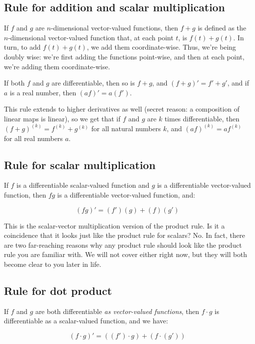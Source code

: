 \documentclass[10pt]{amsart}
\begin{document}
\subsection{Rule for addition and scalar multiplication}

If $f$ and $g$ are $n$-dimensional vector-valued functions, then $f +
g$ is defined as the $n$-dimensional vector-valued function that, at
each point $t$, is $f(t) + g(t)$. In turn, to add $f(t) + g(t)$, we
add them coordinate-wise. Thus, we're being doubly wise: we're first
adding the functions point-wise, and then at each point, we're adding
them coordinate-wise.

If both $f$ and $g$ are differentiable, then so is $f + g$, and $(f +
g)' = f' + g'$, and if $a$ is a real number, then $(af)' = a(f')$.

This rule extends to higher derivatives as well (secret reason: a
composition of linear maps is linear), so we get that if $f$ and $g$
are $k$ times differentiable, then $(f + g)^{(k)} = f^{(k)} + g^{(k)}$
for all natural numbers $k$, and $(af)^{(k)} = af^{(k)}$ for all real
numbers $a$.

\subsection{Rule for scalar multiplication}

If $f$ is a differentiable scalar-valued function and $g$ is a
differentiable vector-valued function, then $fg$ is a differentiable
vector-valued function, and:

$$(fg)' = (f')(g) + (f)(g')$$

This is the scalar-vector multiplication version of the product
rule. Is it a coincidence that it looks just like the product rule for
scalars?  No. In fact, there are two far-reaching reasons why any
product rule should look like the product rule you are familiar
with. We will not cover either right now, but they will both become
clear to you later in life.

\subsection{Rule for dot product}

If $f$ and $g$ are both differentiable {\em as vector-valued
functions}, then $f \cdot g$ is differentiable as a scalar-valued
function, and we have:

$$(f \cdot g)' = ((f') \cdot g) + (f \cdot (g'))$$
\end{document}
